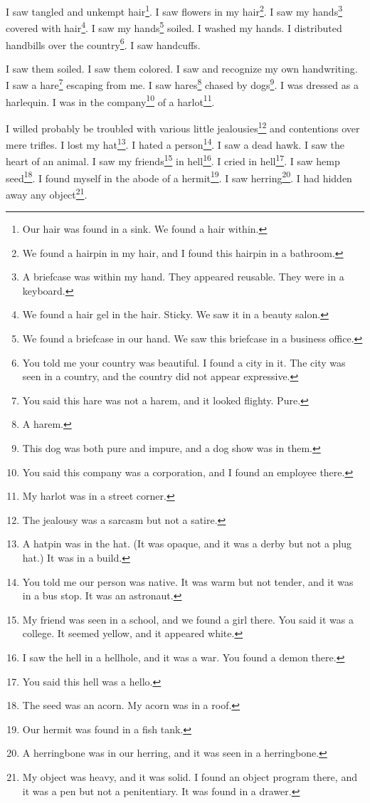 \documentclass[12pt]{book}
\begin{document}
 I saw tangled and unkempt hair\footnote{Our hair was found in a sink. We found a hair within.}. I saw flowers in my hair\footnote{We found a hairpin in my hair, and I found this hairpin in a bathroom.}. I saw my hands\footnote{A briefcase was within my hand. They appeared reusable. They were in a keyboard.} covered with hair\footnote{We found a hair gel in the hair. Sticky. We saw it in a beauty salon.}. I saw my hands\footnote{We found a briefcase in our hand. We saw this briefcase in a business office.} soiled. I washed my hands. I distributed handbills over the country\footnote{You told me your country was beautiful. I found a city in it. The city was seen in a country, and the country did not appear expressive.}. I saw handcuffs. 

 I saw them soiled. I saw them colored. I saw and recognize my own handwriting. I saw a hare\footnote{You said this hare was not a harem, and it looked flighty. Pure.} escaping from me. I saw hares\footnote{A harem.} chased by dogs\footnote{This dog was both pure and impure, and a dog show was in them.}. I was dressed as a harlequin. I was in the company\footnote{You said this company was a corporation, and I found an employee there.} of a harlot\footnote{My harlot was in a street corner.}. 

 I willed probably be troubled with various little jealousies\footnote{The jealousy was a sarcasm but not a satire.} and contentions over mere trifles. I lost my hat\footnote{A hatpin was in the hat. (It was opaque, and it was a derby but not a plug hat.) It was in a build.}. I hated a person\footnote{You told me our person was native. It was warm but not tender, and it was in a bus stop. It was an astronaut.}. I saw a dead hawk. I saw the heart of an animal. I saw my friends\footnote{My friend was seen in a school, and we found a girl there. You said it was a college. It seemed yellow, and it appeared white.} in hell\footnote{I saw the hell in a hellhole, and it was a war. You found a demon there.}. I cried in hell\footnote{You said this hell was a hello.}. I saw hemp seed\footnote{The seed was an acorn. My acorn was in a roof.}. I found myself in the abode of a hermit\footnote{Our hermit was found in a fish tank.}. I saw herring\footnote{A herringbone was in our herring, and it was seen in a herringbone.}. I had hidden away any object\footnote{My object was heavy, and it was solid. I found an object program there, and it was a pen but not a penitentiary. It was found in a drawer.}. 
\end{document}
